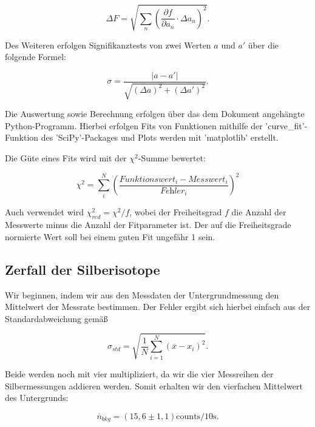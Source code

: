 \documentclass{article}
\begin{document}
\begin{equation}
    \Delta F = \sqrt{\sum_n \left( \frac{\partial f}{\partial a_n} \cdot \Delta a_n \right)^2}.
\end{equation}

Des Weiteren erfolgen Signifikanztests von zwei Werten $a$ und $a'$ über die folgende Formel:

\begin{equation}
    \sigma = \frac{|a-a'|}{\sqrt{(\Delta a)^2 + (\Delta a')^2}}.
\end{equation}

Die Auswertung sowie Berechnung erfolgen über das dem Dokument angehängte Python-Programm. Hierbei erfolgen Fits von Funktionen mithilfe der 'curve\_fit'-Funktion des 'SciPy'-Packages und Plots werden mit 'matplotlib' erstellt.

Die Güte eines Fits wird mit der $\chi^2$-Summe bewertet:

\begin{equation}
    \chi^2 = \sum_i^N \left( \frac{\textit{Funktionswert}_i - \textit{Messwert}_i}{\textit{Fehler}_i} \right)^2
\end{equation}

Auch verwendet wird $\chi^2_{red} = \chi^2 / f$, wobei der Freiheitsgrad $f$ die Anzahl der Messwerte minus die Anzahl der Fitparameter ist. Der auf die Freiheitsgrade normierte Wert soll bei einem guten Fit ungefähr 1 sein.


\newpage

\subsection{Zerfall der Silberisotope}

Wir beginnen, indem wir aus den Messdaten der Untergrundmessung den Mittelwert der Messrate bestimmen. Der Fehler ergibt sich hierbei einfach aus der Standardabweichung gemäß

\begin{equation}
    \sigma_{std} = \sqrt{\frac{1}{N} \sum_{i=1}^N (\overline{x} - x_i)^2}.
\end{equation}

Beide werden noch mit vier multipliziert, da wir die vier Messreihen der Silbermessungen addieren werden. Somit erhalten wir den vierfachen Mittelwert des Untergrunds:

\begin{equation}
    \overline{n}_{bkg} = (15,6 \pm 1,1) \text{counts/10s}.
\end{equation}
\end{document}
